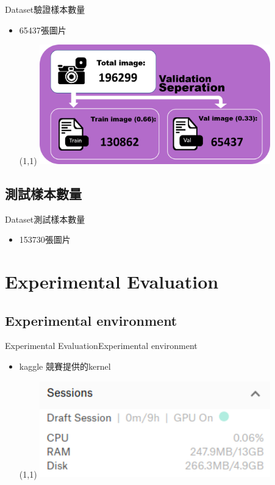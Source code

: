\documentclass{beamer}
\begin{document}
\begin{CJK}{UTF8}{}
\begin{frame}{Dataset}{驗證樣本數量}
\vspace{-4.5cm}
	\begin{itemize}
	\item{
		65437張圖片
		\begin{textblock}{3}(1,1)
		\includegraphics[width=10cm]{data_split.png}
		\end{textblock}
	}
	\end{itemize}
\end{frame}

\subsection{測試樣本數量}

\begin{frame}{Dataset}{測試樣本數量}
	\begin{itemize}
	\item{
		153730張圖片
	}
	\end{itemize}
\end{frame}

\section{Experimental Evaluation}

\subsection{Experimental environment}

\begin{frame}{Experimental Evaluation}{Experimental environment}
\vspace{-4.5cm}
	\begin{itemize}
	\item{
		kaggle 競賽提供的kernel
		\begin{textblock}{3}(1,1)
		\includegraphics[width=10cm]{kernel.png}
		\end{textblock}
		
}
\end{itemize}
\end{frame}
\end{CJK}
\end{document}
